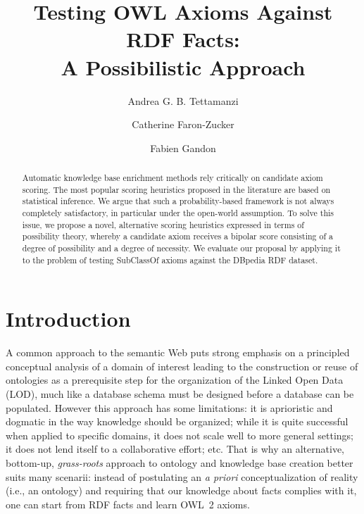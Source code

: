 \documentclass{llncs}
\begin{document}
\title{Testing OWL Axioms Against RDF Facts:\\
A Possibilistic Approach}


\author{Andrea G. B. Tettamanzi \and Catherine Faron-Zucker \and Fabien Gandon}




\maketitle

\begin{abstract}
Automatic knowledge base enrichment methods rely critically on candidate axiom scoring.
The most popular scoring heuristics proposed in the literature are based on statistical inference.
We argue that such a probability-based framework is not always completely satisfactory, in particular under the open-world  assumption.
To solve this issue, we propose a novel, alternative scoring
heuristics expressed in terms of possibility theory, whereby a candidate axiom receives
a bipolar score consisting of a degree of possibility and a degree of necessity.
We evaluate our proposal by applying it to the problem of testing \textsf{SubClassOf}
axioms against the DBpedia RDF dataset.

\end{abstract}




\section{Introduction}
A common approach to the semantic Web puts strong emphasis
on a principled conceptual analysis of a domain of interest
leading to the construction or reuse of ontologies
as a prerequisite step for the organization of the Linked Open Data (LOD),
much like a database schema must be designed before a database can be populated.
However this approach has some limitations:
it is aprioristic and dogmatic in the way knowledge should be organized;
while it is quite successful when applied to specific domains,
it does not scale well to more general settings;
it does not lend itself to a collaborative effort; etc.
That is why an alternative, bottom-up, \emph{grass-roots} approach to ontology and
knowledge base creation better suits many scenarii: instead of postulating an \emph{a priori}
conceptualization of reality (i.e., an ontology) and requiring that our knowledge
about facts complies with it, one can start from RDF facts and learn OWL~2 axioms.
\end{document}
